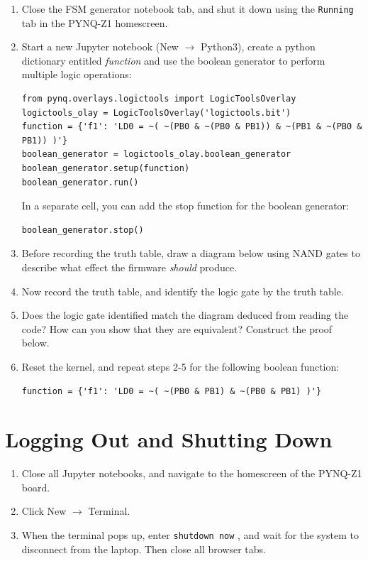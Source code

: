 \documentclass{article}
\begin{document}
\begin{enumerate}
\item Close the FSM generator notebook tab, and shut it down using the \verb+Running+ tab in the PYNQ-Z1 homescreen.
\item Start a new Jupyter notebook (New $\rightarrow$ Python3), create a python dictionary entitled \textit{function} and use the boolean generator to perform multiple logic operations:
\begin{verbatim}
from pynq.overlays.logictools import LogicToolsOverlay
logictools_olay = LogicToolsOverlay('logictools.bit')
function = {'f1': 'LD0 = ~( ~(PB0 & ~(PB0 & PB1)) & ~(PB1 & ~(PB0 & PB1)) )'}
boolean_generator = logictools_olay.boolean_generator
boolean_generator.setup(function)
boolean_generator.run()
\end{verbatim}
In a separate cell, you can add the stop function for the boolean generator:
\begin{verbatim}
boolean_generator.stop()
\end{verbatim}
\item Before recording the truth table, draw a diagram below using NAND gates to describe what effect the firmware \textit{should} produce. \\ \vspace{1cm}
\item Now record the truth table, and identify the logic gate by the truth table. \\ \vspace{1cm}
\item Does the logic gate identified match the diagram deduced from reading the code?  How can you show that they are equivalent? Construct the proof below. \\ \vspace{2cm}
\item Reset the kernel, and repeat steps 2-5 for the following boolean function:
\begin{verbatim}
function = {'f1': 'LD0 = ~( ~(PB0 & PB1) & ~(PB0 & PB1) )'}
\end{verbatim}
\vspace{5cm}
\end{enumerate}

\section{Logging Out and Shutting Down}

\begin{enumerate}
\item Close all Jupyter notebooks, and navigate to the homescreen of the PYNQ-Z1 board.
\item Click New $\rightarrow$ Terminal.
\item When the terminal pops up, enter \verb+shutdown now+ , and wait for the system to disconnect from the laptop.  Then close all browser tabs.
\end{enumerate}
\end{document}
